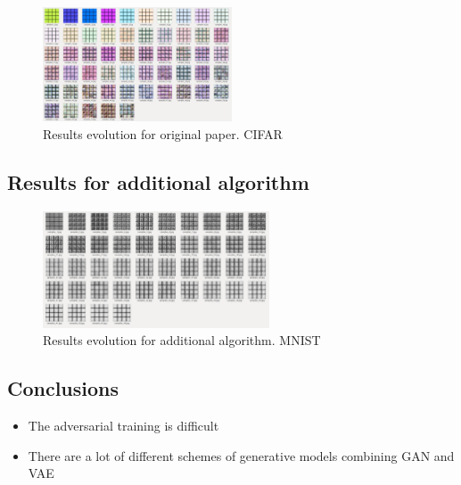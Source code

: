 \documentclass{article}
\begin{document}
    \begin{center}
        \begin{figure}[H]
            \centering
            \includegraphics[width=0.5\textwidth]{figures/CIFAR-original-evolution.png}
            \caption{Results evolution for original paper. CIFAR}
        \end{figure}
    \end{center}


    \subsection{Results for additional algorithm}
    \begin{center}
        \begin{figure}[H]
            \centering
            \includegraphics[width=0.6\textwidth]{figures/MNIST-additional-evolution.png}
            \caption{Results evolution for additional algorithm. MNIST}
        \end{figure}
    \end{center}

    \subsection{Conclusions}
    \begin{itemize}
        \item The adversarial training is difficult
        \item There are a lot of different schemes of generative models combining GAN and VAE
    \end{itemize}
\end{document}

